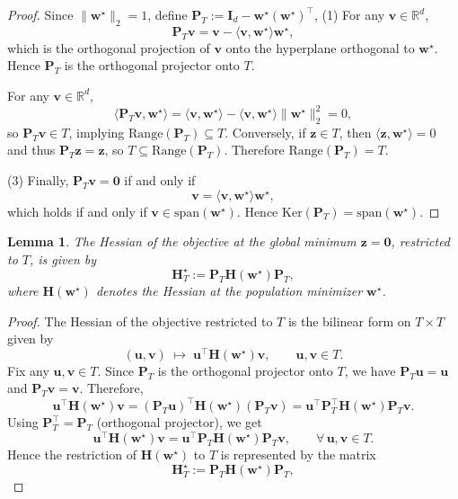 \documentclass{article}
\theoremstyle{plain}
\newtheorem{lemma}[theorem]{Lemma}
\theoremstyle{definition}
\theoremstyle{remark}
\begin{document}
{\begin{proof}
Since $\|\mathbf w^\star\|_2 = 1$, define $\mathbf P_T := \mathbf I_d - \mathbf w^\star (\mathbf w^\star)^\top$, 
(1) For any $\mathbf v \in \mathbb R^d$,
\[
\mathbf P_T \mathbf v
= \mathbf v - \langle \mathbf v, \mathbf w^\star\rangle \mathbf w^\star ,
\]
which is the orthogonal projection of $\mathbf v$ onto the hyperplane orthogonal to $\mathbf w^\star$. Hence $\mathbf P_T$ is the orthogonal projector onto $T$.

For any $\mathbf v \in \mathbb R^d$,
\[
\langle \mathbf P_T \mathbf v, \mathbf w^\star\rangle
= \langle \mathbf v, \mathbf w^\star\rangle - \langle \mathbf v, \mathbf w^\star\rangle \|\mathbf w^\star\|_2^2
= 0 ,
\]
so $\mathbf P_T \mathbf v \in T$, implying $\mathrm{Range}(\mathbf P_T) \subseteq T$.
Conversely, if $\mathbf z \in T$, then $\langle \mathbf z, \mathbf w^\star\rangle = 0$ and thus
$\mathbf P_T \mathbf z = \mathbf z$, so $T \subseteq \mathrm{Range}(\mathbf P_T)$.
Therefore $\mathrm{Range}(\mathbf P_T) = T$.

\noindent
(3) Finally, $\mathbf P_T \mathbf v = \mathbf 0$ if and only if
\[
\mathbf v = \langle \mathbf v, \mathbf w^\star\rangle \mathbf w^\star ,
\]
which holds if and only if $\mathbf v \in \mathrm{span}(\mathbf w^\star)$.
Hence $\mathrm{Ker}(\mathbf P_T) = \mathrm{span}(\mathbf w^\star)$.
\end{proof}



\begin{lemma}
\label{lem:tangent_hessian}
The Hessian of the objective at the global minimum $\mathbf{z}=\mathbf{0}$,
restricted to $T$, is given by
\[
\mathbf{H}_T^\star := \mathbf{P}_T \mathbf{H}(\mathbf{w}^\star) \mathbf{P}_T,
\]
where $\mathbf{H}(\mathbf{w}^\star)$ denotes the Hessian at the population minimizer
$\mathbf{w}^\star$.
\end{lemma}

\begin{proof}
 The Hessian of the objective
restricted to $T$ is the bilinear form on $T\times T$ given by
\[
(\mathbf{u},\mathbf{v}) \;\mapsto\; \mathbf{u}^\top \mathbf{H}(\mathbf{w}^\star)\mathbf{v},
\qquad \mathbf{u},\mathbf{v}\in T.
\]
Fix any $\mathbf{u},\mathbf{v}\in T$. Since $\mathbf{P}_{T}$ is the orthogonal
projector onto $T$, we have $\mathbf{P}_{T}\mathbf{u}=\mathbf{u}$ and
$\mathbf{P}_{T}\mathbf{v}=\mathbf{v}$. Therefore,
\[
\mathbf{u}^\top \mathbf{H}(\mathbf{w}^\star)\mathbf{v}
=
(\mathbf{P}_{T}\mathbf{u})^\top \mathbf{H}(\mathbf{w}^\star)(\mathbf{P}_{T}\mathbf{v})
=
\mathbf{u}^\top \mathbf{P}_{T}^\top \mathbf{H}(\mathbf{w}^\star)\mathbf{P}_{T}\mathbf{v}.
\]
Using $\mathbf{P}_{T}^\top=\mathbf{P}_{T}$ (orthogonal projector), we get
\[
\mathbf{u}^\top \mathbf{H}(\mathbf{w}^\star)\mathbf{v}
=
\mathbf{u}^\top \mathbf{P}_{T} \mathbf{H}(\mathbf{w}^\star)\mathbf{P}_{T}\mathbf{v},
\qquad \forall\,\mathbf{u},\mathbf{v}\in T.
\]
Hence the restriction of $\mathbf{H}(\mathbf{w}^\star)$ to $T$ is represented by the matrix
\[
\mathbf{H}_{T}^\star := \mathbf{P}_{T} \mathbf{H}(\mathbf{w}^\star)\mathbf{P}_{T},
\]
\end{proof}

}
\end{document}
